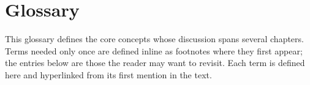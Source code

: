 \chapter*{Glossary}

This glossary defines the core concepts whose discussion spans several chapters. Terms needed only once are defined inline as footnotes where they first appear; the entries below are those the reader may want to revisit. Each term is defined here and hyperlinked from its first mention in the text.

\printnoidxglossaries
